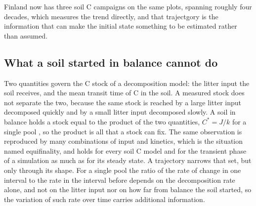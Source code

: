 \documentclass[11pt]{article}
\begin{document}
Finland now has three soil C campaigns on the same plots, spanning roughly four decades, which measures the trend directly, and that trajectgory is the information that can make the initial state something to be estimated rather than assumed.

\subsection{What a soil started in balance cannot do}

Two quantities govern the C stock of a decomposition model: the litter input the soil
receives, and the mean transit time of C in the soil. A measured stock does not separate
the two, because the same stock is reached by a large litter input decomposed quickly and
by a small litter input decomposed slowly. A soil in balance holds a stock equal to the
product of the two quantities, $C^{*} = J/k$ for a single pool \citep{Olson1963}, so the
product is all that a stock can fix. The same observation is reproduced by many
combinations of input and kinetics, which is the situation \citet{Beven2006} named
equifinality, and holds for every soil C model and for the transient phase
of a simulation as much as for its steady state.
A trajectory narrows that set, but only through its shape. For a single pool the ratio
of the rate of change in one interval to the rate in the interval before depends on the
decomposition rate alone, and not on the litter input nor on how far from balance the
soil started, so the variation of such rate over time carries additional information.
\end{document}
